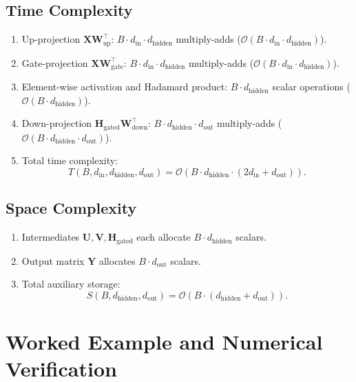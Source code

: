 \documentclass[11pt]{article}
\begin{document}
\subsection{Time Complexity}
\begin{enumerate}
    \item Up-projection $\mathbf{X} \mathbf{W}_{\text{up}}^\top$: $B \cdot d_{\text{in}} \cdot d_{\text{hidden}}$ multiply-adds ($\mathcal{O}(B \cdot d_{\text{in}} \cdot d_{\text{hidden}})$).
    \item Gate-projection $\mathbf{X} \mathbf{W}_{\text{gate}}^\top$: $B \cdot d_{\text{in}} \cdot d_{\text{hidden}}$ multiply-adds ($\mathcal{O}(B \cdot d_{\text{in}} \cdot d_{\text{hidden}})$).
    \item Element-wise activation and Hadamard product: $B \cdot d_{\text{hidden}}$ scalar operations ($\mathcal{O}(B \cdot d_{\text{hidden}})$).
    \item Down-projection $\mathbf{H}_{\text{gated}} \mathbf{W}_{\text{down}}^\top$: $B \cdot d_{\text{hidden}} \cdot d_{\text{out}}$ multiply-adds ($\mathcal{O}(B \cdot d_{\text{hidden}} \cdot d_{\text{out}})$).
    \item Total time complexity:
    \begin{equation}
    T(B, d_{\text{in}}, d_{\text{hidden}}, d_{\text{out}}) = \mathcal{O}\left( B \cdot d_{\text{hidden}} \cdot (2 d_{\text{in}} + d_{\text{out}}) \right).
    \end{equation}
\end{enumerate}

\subsection{Space Complexity}
\begin{enumerate}
    \item Intermediates $\mathbf{U}, \mathbf{V}, \mathbf{H}_{\text{gated}}$ each allocate $B \cdot d_{\text{hidden}}$ scalars.
    \item Output matrix $\mathbf{Y}$ allocates $B \cdot d_{\text{out}}$ scalars.
    \item Total auxiliary storage:
    \begin{equation}
    S(B, d_{\text{hidden}}, d_{\text{out}}) = \mathcal{O}(B \cdot (d_{\text{hidden}} + d_{\text{out}})).
    \end{equation}
\end{enumerate}

\section{Worked Example and Numerical Verification}
\label{sec:worked_example}
\end{document}
